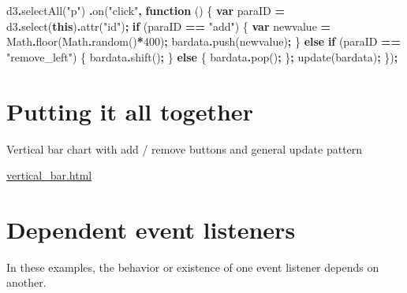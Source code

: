 \documentclass[
  openany]{book}
\newenvironment{Shaded}{\begin{snugshade}}{\end{snugshade}}
\newcommand{\BuiltInTok}[1]{#1}
\newcommand{\ControlFlowTok}[1]{\textcolor[rgb]{0.13,0.29,0.53}{\textbf{#1}}}
\newcommand{\DecValTok}[1]{\textcolor[rgb]{0.00,0.00,0.81}{#1}}
\newcommand{\FunctionTok}[1]{\textcolor[rgb]{0.00,0.00,0.00}{#1}}
\newcommand{\KeywordTok}[1]{\textcolor[rgb]{0.13,0.29,0.53}{\textbf{#1}}}
\newcommand{\NormalTok}[1]{#1}
\newcommand{\OperatorTok}[1]{\textcolor[rgb]{0.81,0.36,0.00}{\textbf{#1}}}
\newcommand{\StringTok}[1]{\textcolor[rgb]{0.31,0.60,0.02}{#1}}
\begin{document}
\begin{Shaded}
\begin{Highlighting}[]
\NormalTok{d3}\OperatorTok{.}\FunctionTok{selectAll}\NormalTok{(}\StringTok{"p"}\NormalTok{)}
    \OperatorTok{.}\FunctionTok{on}\NormalTok{(}\StringTok{"click"}\OperatorTok{,} \KeywordTok{function}\NormalTok{ () \{}
      \KeywordTok{var}\NormalTok{ paraID }\OperatorTok{=}\NormalTok{ d3}\OperatorTok{.}\FunctionTok{select}\NormalTok{(}\KeywordTok{this}\NormalTok{)}\OperatorTok{.}\FunctionTok{attr}\NormalTok{(}\StringTok{"id"}\NormalTok{)}\OperatorTok{;}
      \ControlFlowTok{if}\NormalTok{ (paraID }\OperatorTok{==} \StringTok{"add"}\NormalTok{) \{}
          \KeywordTok{var}\NormalTok{ newvalue }\OperatorTok{=} \BuiltInTok{Math}\OperatorTok{.}\FunctionTok{floor}\NormalTok{(}\BuiltInTok{Math}\OperatorTok{.}\FunctionTok{random}\NormalTok{()}\OperatorTok{*}\DecValTok{400}\NormalTok{)}\OperatorTok{;}
\NormalTok{          bardata}\OperatorTok{.}\FunctionTok{push}\NormalTok{(newvalue)}\OperatorTok{;}
\NormalTok{          \} }\ControlFlowTok{else} \ControlFlowTok{if}\NormalTok{ (paraID }\OperatorTok{==} \StringTok{"remove\_left"}\NormalTok{) \{}
\NormalTok{          bardata}\OperatorTok{.}\FunctionTok{shift}\NormalTok{()}\OperatorTok{;}
\NormalTok{          \} }\ControlFlowTok{else}\NormalTok{ \{}
\NormalTok{          bardata}\OperatorTok{.}\FunctionTok{pop}\NormalTok{()}\OperatorTok{;}
\NormalTok{          \}}\OperatorTok{;}
\NormalTok{      update(bardata)}\OperatorTok{;}
\NormalTok{      \})}\OperatorTok{;}
\end{Highlighting}
\end{Shaded}

\hypertarget{putting-it-all-together}{%
\section{Putting it all together}\label{putting-it-all-together}}

Vertical bar chart with add / remove buttons and general update pattern

\href{code/vertical_bar.html}{vertical\_bar.html}

\hypertarget{dependent-event-listeners}{%
\section{Dependent event listeners}\label{dependent-event-listeners}}

In these examples, the behavior or existence of one event listener depends on another.
\end{document}
